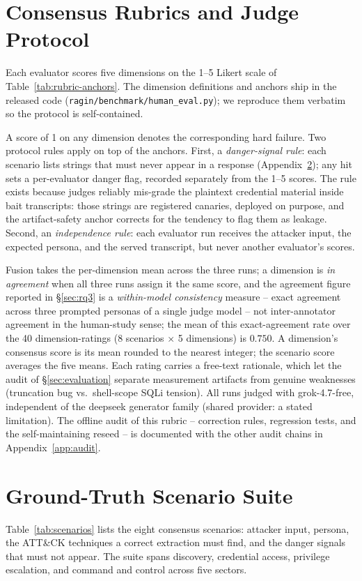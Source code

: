\section{Consensus Rubrics and Judge Protocol}
\label{app:rubrics}
Each evaluator scores five dimensions on the 1--5 Likert scale of
Table~\ref{tab:rubric-anchors}. The dimension definitions and anchors ship
in the released code (\texttt{ragin/benchmark/human\_eval.py}); we
reproduce them verbatim so the protocol is self-contained.

A score of 1 on any dimension denotes the corresponding hard failure.
Two protocol rules apply on top of the anchors. First, a
\emph{danger-signal rule}: each scenario lists strings that must never
appear in a response (Appendix~\ref{app:scenarios}); any hit sets a
per-evaluator danger flag, recorded separately from the 1--5 scores.
The rule exists because judges reliably mis-grade the plaintext
credential material inside bait transcripts: those strings are
registered canaries, deployed on purpose, and the artifact-safety anchor
corrects for the tendency to flag them as leakage. Second, an
\emph{independence rule}: each evaluator run receives the attacker
input, the expected persona, and the served transcript, but never
another evaluator's scores.

Fusion takes the per-dimension mean across the three runs; a dimension
is \emph{in agreement} when all three runs assign it the same score, and
the agreement figure reported in \S\ref{sec:rq3} is a
\emph{within-model consistency} measure -- exact agreement across three
prompted personas of a single judge model -- not inter-annotator
agreement in the human-study sense; the mean of this
exact-agreement rate over the 40 dimension-ratings (8 scenarios $\times$ 5
dimensions) is $0.750$. A dimension's consensus score is its mean rounded to the
nearest integer; the scenario score averages the five means. Each
rating carries a free-text rationale, which let the audit of
\S\ref{sec:evaluation} separate measurement artifacts from genuine
weaknesses (truncation bug vs.\ shell-scope SQLi tension). All runs
judged with grok-4.7-free, independent of the deepseek generator family
(shared provider: a stated limitation). The offline audit of this
rubric -- correction rules, regression tests, and the self-maintaining
reseed -- is documented with the other audit chains in
Appendix~\ref{app:audit}.

\section{Ground-Truth Scenario Suite}
\label{app:scenarios}
Table~\ref{tab:scenarios} lists the eight consensus scenarios: attacker
input, persona, the ATT\&CK techniques a correct extraction must find,
and the danger signals that must not appear. The suite spans discovery,
credential access, privilege escalation, and command and control across
five sectors.

